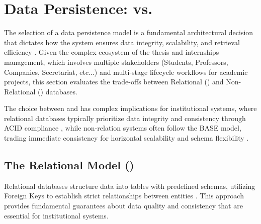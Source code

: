 \section{Data Persistence:  vs. }
\label{sec:sota_data_persitance}
\ntindex[Template]{}
    {
        The selection of a data persistence model is a fundamental architectural decision that dictates how the system ensures data integrity, scalability, and retrieval efficiency \cite{ali-2019-sql-nosql-bigdata}.
        Given the complex ecosystem of the thesis and internships management, which involves multiple stakeholders (Students, Professors, Companies, Secretariat, etc...) and multi-stage
        lifecycle workflows for academic projects, this section evaluates the trade-offs between Relational () and Non-Relational () databases.
    }

    {
        The choice between  and  has complex implications for institutional systems,
        where relational databases typically prioritize data integrity and consistency through \gls{ACID} compliance \cite{datacamp-acid-2025},
        while non-relation systems often follow the \gls{BASE} model, trading immediate consistency for horizontal scalability and schema flexibility \cite{aws-acid-vs-base-2026}.
    }


    \subsection{The Relational Model ()}
        {
            Relational databases structure data into tables with predefined schemas, utilizing Foreign Keys to establish strict relationships between entities \cite{ibm-db2-foreignkey-121}. 
            This approach provides fundamental guarantees about data quality and consistency that are essential for institutional systems.
        }

